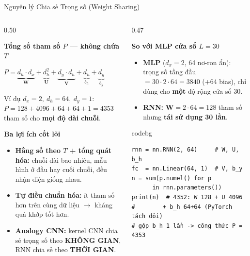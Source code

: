 \documentclass[aspectratio=169, 10pt]{beamer}
\newenvironment{codebox}{\begin{beamercolorbox}[sep=3pt, rounded=true]{codebg}\footnotesize\ttfamily}{\end{beamercolorbox}}
\begin{document}
\begin{frame}[fragile]{Nguyên lý Chia sẻ Trọng số (Weight Sharing)}
\vspace{0.03cm}
\begin{columns}[T]
\begin{column}{0.50\textwidth}
\begin{block}{\textbf{Tổng số tham số \(P\) — không chứa \(T\)}}
{\scriptsize\centering
\(P = \underbrace{d_h \cdot d_x}_{\mathbf{W}} + \underbrace{d_h^2}_{\mathbf{U}} + \underbrace{d_y \cdot d_h}_{\mathbf{V}} + \underbrace{d_h}_{b_h} + \underbrace{d_y}_{b_y}\)\par
Ví dụ \(d_x = 2,\ d_h = 64,\ d_y = 1\): \(P = 128 + 4096 + 64 + 64 + 1 = 4353\) tham số cho \textbf{mọi độ dài chuỗi}.\par}
\end{block}
\vspace{0.05cm}
\begin{exampleblock}{\textbf{Ba lợi ích cốt lõi}}
{\scriptsize
\begin{itemize}\itemsep1pt
    \item \textbf{Hằng số theo \(T\) + tổng quát hóa:} chuỗi dài bao nhiêu, mẫu hình ở đầu hay cuối chuỗi, đều nhận diện giống nhau.
    \item \textbf{Tự điều chuẩn hóa:} ít tham số hơn trên cùng dữ liệu \(\rightarrow\) kháng quá khớp tốt hơn.
    \item \textbf{Analogy CNN:} kernel CNN chia sẻ trọng số theo \textbf{KHÔNG GIAN}, RNN chia sẻ theo \textbf{THỜI GIAN}.
\end{itemize}}
\end{exampleblock}
\end{column}
\begin{column}{0.47\textwidth}
\begin{alertblock}{\textbf{So với MLP cửa sổ \(L=30\)}}
{\scriptsize
\begin{itemize}\itemsep1pt
    \item \textbf{MLP} (\(d_x=2\), 64 nơ-ron ẩn): trọng số tầng đầu \(= 30 \cdot 2 \cdot 64 = 3840\) (+64 bias), chỉ dùng cho \textbf{một} độ rộng cửa sổ 30.
    \item \textbf{RNN:} \(\mathbf{W} = 2 \cdot 64 = 128\) tham số nhưng \textbf{tái sử dụng 30 lần}.
\end{itemize}}
\end{alertblock}
\vspace{0.03cm}
\begin{codebox}\scriptsize
\begin{verbatim}
rnn = nn.RNN(2, 64)     # W, U, b_h
fc  = nn.Linear(64, 1)  # V, b_y
n = sum(p.numel() for p
      in rnn.parameters())
print(n)  # 4352: W 128 + U 4096
#        + b_h 64+64 (PyTorch tách đôi)
# gộp b_h 1 lần -> công thức P = 4353
\end{verbatim}
\end{codebox}
\end{column}
\end{columns}
\end{frame}
\end{document}
